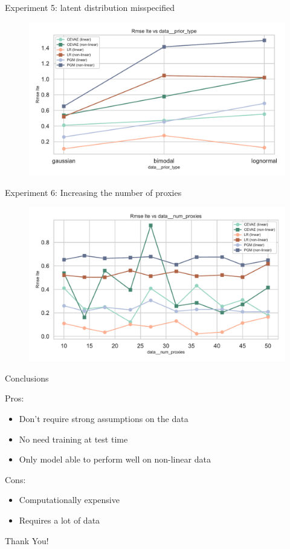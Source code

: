 \documentclass[10pt]{beamer}
\begin{document}
\begin{frame}{Experiment 5: latent distribution misspecified}
    \begin{figure}[H]
      \includegraphics[width=\textwidth]{../src/results/MyRun_data__prior_type--rmse_ite.pdf}
    \end{figure}
\end{frame}

\begin{frame}{Experiment 6: Increasing the number of proxies}
    \begin{figure}[H]
      \includegraphics[width=\textwidth]{../src/results/MyRun_data__num_proxies--rmse_ite.pdf}
    \end{figure}
\end{frame}

\begin{frame}{Conclusions}

  Pros:
  \begin{itemize}
    \item Don't require strong assumptions on the data
    \item No need training at test time
    \item Only model able to perform well on non-linear data
  \end{itemize}

  Cons:
  \begin{itemize}
    \item Computationally expensive
    \item Requires a lot of data
  \end{itemize}
\end{frame}

{
\begin{frame}[standout]
\thispagestyle{empty}
  {\LARGE Thank You!}
\end{frame}
}
\end{document}
